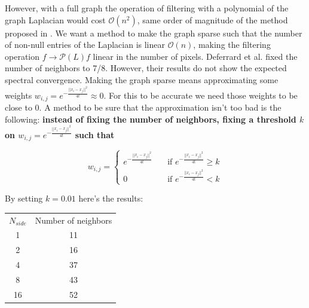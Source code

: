 However, with a full graph the operation of filtering with a polynomial of the graph Laplacian would cost $\mathcal O (n^2)$, same order of magnitude of the method proposed in \cite{bibid}. We want a method to make the graph sparse such that the number of non-null entries of the Laplacian is linear $\mathcal O (n)$, making the filtering operation $f\rightarrow \mathcal P(L)f$ linear in the number of pixels. Deferrard et al. \cite{bibid} fixed the number of neighbors to 7/8. However, their results do not show the expected spectral convergence.
Making the graph sparse means approximating some weights $w_{i,j}=e^{-\frac{||x_i-x_j||^2}{4t}} \approx 0$. For this to be accurate we need those weights to be close to 0. A method to be sure that the approximation isn't too bad is the following: \textbf{instead of fixing the number of neighbors, fixing a threshold $k$ on $w_{i,j}=e^{-\frac{||x_i-x_j||^2}{4t}}$ such that} 

$$w_{i,j} = \begin{cases}
e^{-\frac{||x_i-x_j||^2}{4t}}\quad& \text{if } e^{-\frac{||x_i-x_j||^2}{4t}} \geq k\\
0 \quad & \text{if } e^{-\frac{||x_i-x_j||^2}{4t}} < k
\end{cases}$$

By setting $k = 0.01$ here's the results:

\begin{center}
	\begin{tabular}{ c|c} 
		
		$N_{side}$ & Number of neighbors \\ 
		
		1 & 11 \\ 
		2 & 16 \\ 
		4 & 37 \\ 
		8 & 43 \\ 
		16 & 52 \\ 
		
	\end{tabular}
\end{center}


